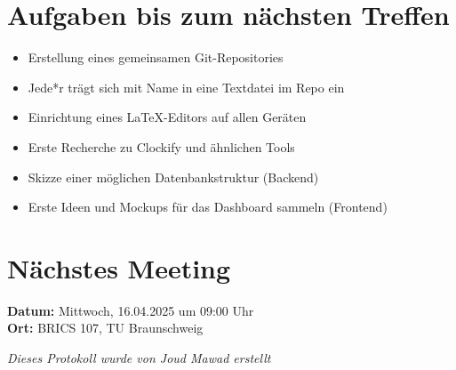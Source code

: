 \documentclass[11pt,a4paper]{article}
\newcommand{\checkbox}{\(\square\)}
\begin{document}
\section*{Aufgaben bis zum nächsten Treffen}
\begin{itemize}[label=\checkbox]
    \item Erstellung eines gemeinsamen Git-Repositories
    \item Jede*r trägt sich mit Name in eine Textdatei im Repo ein
    \item Einrichtung eines LaTeX-Editors auf allen Geräten
    \item Erste Recherche zu Clockify und ähnlichen Tools
    \item Skizze einer möglichen Datenbankstruktur (Backend)
    \item Erste Ideen und Mockups für das Dashboard sammeln (Frontend)
\end{itemize}

\section*{Nächstes Meeting}
\textbf{Datum:} Mittwoch, 16.04.2025 um 09:00 Uhr \\
\textbf{Ort:} BRICS 107, TU Braunschweig

\vspace{1em}
\begin{center}
    \textit{Dieses Protokoll wurde von Joud Mawad erstellt}
\end{center}
\end{document}
